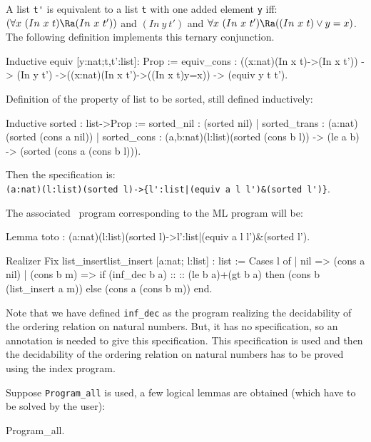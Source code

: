 A list \verb=t'= is equivalent to a list \verb=t= with one added
element \verb=y= iff: $(\forall x~(In~x~t) \Ra (In~x~t'))$ and
$(In~y~t')$ and $\forall x~(In~x~t') \Ra ((In~x~t) \vee y=x)$. The
following definition implements this ternary conjunction.
\begin{coq_example*}
Inductive equiv [y:nat;t,t':list]: Prop :=
      equiv_cons : 
        ((x:nat)(In x t)->(In x t'))
        -> (In y t')
        ->((x:nat)(In x t')->((In x t)\/y=x))
        -> (equiv y t t').
\end{coq_example*}

Definition of the property of list to be sorted, still defined
inductively:
\begin{coq_example*}
Inductive sorted : list->Prop
        := sorted_nil  : (sorted nil)
        | sorted_trans : (a:nat)(sorted (cons a nil))
        | sorted_cons : (a,b:nat)(l:list)(sorted (cons b l)) -> (le a b) 
                         -> (sorted (cons a (cons b l))).
\end{coq_example*}
Then the specification is:\\
\verb!(a:nat)(l:list)(sorted l)->{l':list|(equiv a l l')&(sorted l')}!.

The associated \real\ program corresponding to the ML program will be:
\begin{coq_eval}
Lemma toto : (a:nat)(l:list)(sorted l)->{l':list|(equiv a l l')&(sorted l')}.
\end{coq_eval}
\begin{coq_example*}
Realizer
  Fix list_insert{list_insert [a:nat; l:list] : list := 
         Cases l of
         | nil => (cons a nil)
         | (cons b m) => 
                if (inf_dec b a) :: :: { {(le b a)}+{(gt b a)} } 
                then (cons b (list_insert a m))
                else (cons a (cons b m))
         end}.
\end{coq_example*}
Note that we have defined \verb=inf_dec= as the program realizing the
decidability of the ordering relation on natural numbers. But, it has
no specification, so an annotation is needed to give this
specification. This specification is used and then the decidability of
the ordering relation on natural numbers has to be proved using the
index program.

Suppose \verb=Program_all= is used, a few logical
lemmas are obtained (which have to be solved by the user):
\begin{coq_example}
Program_all.
\end{coq_example}


